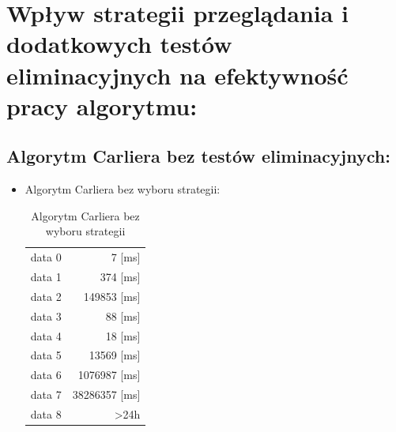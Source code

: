 \documentclass[11pt]{article}
\begin{document}
\section{ Wpływ strategii przeglądania i dodatkowych testów eliminacyjnych na efektywność pracy algorytmu:}
\subsection{Algorytm Carliera bez testów eliminacyjnych:
}
\begin{itemize}
\item Algorytm Carliera bez wyboru strategii:\\
\begin{table}[!ht]
  \begin{center}
    \begin{tabular}{| l | r |}
    \hline
   
data 0 &7 [ms]\\
data 1 & 374 [ms]\\
data 2 & 149853 [ms]\\
data 3 & 88 [ms]\\
data 4 & 18 [ms]\\
data 5 & 13569 [ms]\\
data 6 & 1076987 [ms]\\
data 7 & 38286357 [ms]\\
data 8 &>24h\\

    \hline
    \end{tabular}
  \end{center}
  \caption{Algorytm Carliera bez wyboru strategii}
\end{table}


\end{itemize}
\end{document}

